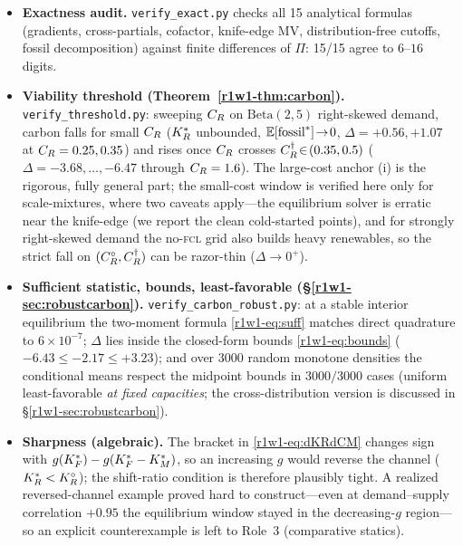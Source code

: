 \begin{itemize}[leftmargin=1.6em]
        ($-4.28,-2.76,-2.19,-5.21,-21.1,-92.1$; the last is a noisy
        finite-difference at the knife-edge $\KRs=9.2$), confirming the channel
        across the crossing. The Hessian's three eigenvalues are all strictly negative on the
        interior path and acquire a zero only as $\KRs\!\to\!\infty$ at the
        knife-edge ($\CM=0.30$, $\KRs=9.2$ and climbing)---the boundary where
        Condition~\ref{r1w1-cond:reg} lapses and the inequality is anyway immediate.
  \item \textbf{Exactness audit.} \texttt{verify\_exact.py} checks all 15
        analytical formulas (gradients, cross-partials, cofactor, knife-edge
        $\mathrm{MV}$, distribution-free cutoffs, fossil decomposition) against
        finite differences of $\Pi$: 15/15 agree to $6$--$16$ digits.
  \item \textbf{Viability threshold (Theorem~\ref{r1w1-thm:carbon}).}
        \texttt{verify\_threshold.py}: sweeping $C_R$ on $\mathrm{Beta}(2,5)$
        right-skewed demand, carbon falls for small $C_R$ ($K_R^{*}$ unbounded,
        $\mathbb{E}[\text{fossil}^{*}]\!\to\!0$, $\Delta=+0.56,+1.07$ at $C_R=0.25,0.35$)
        and rises once $C_R$ crosses $C_R^{\dagger}\!\in\!(0.35,0.5)$
        ($\Delta=-3.68,\dots,-6.47$ through $C_R=1.6$). The large-cost anchor (i)
        is the rigorous, fully general part; the small-cost window is verified
        here only for scale-mixtures, where two caveats apply---the equilibrium
        solver is erratic near the knife-edge (we report the clean
        cold-started points), and for strongly right-skewed demand the no-\textsc{fcl}
        grid also builds heavy renewables, so the strict fall on
        $(C_R^{\circ},C_R^{\dagger})$ can be razor-thin ($\Delta\!\to\!0^{+}$).
  \item \textbf{Sufficient statistic, bounds, least-favorable
        (\S\ref{r1w1-sec:robustcarbon}).} \texttt{verify\_carbon\_robust.py}: at a
        stable interior equilibrium the two-moment formula \eqref{r1w1-eq:suff} matches
        direct quadrature to $6\times10^{-7}$; $\Delta$ lies inside the
        closed-form bounds \eqref{r1w1-eq:bounds} ($-6.43\le-2.17\le+3.23$); and over
        $3000$ random monotone densities the conditional means respect the
        midpoint bounds in $3000/3000$ cases (uniform least-favorable \emph{at fixed
        capacities}; the cross-distribution version is discussed in
        \S\ref{r1w1-sec:robustcarbon}).
  \item \textbf{Sharpness (algebraic).} The bracket in \eqref{r1w1-eq:dKRdCM} changes
        sign with $g(K_F^{*})-g(K_F^{*}-K_M^{*})$, so an increasing $g$ would reverse the
        channel ($K_R^{*}<K_R^{\circ}$); the shift-ratio condition is therefore plausibly
        tight. A realized reversed-channel example proved hard to construct---even
        at demand--supply correlation $+0.95$ the equilibrium window stayed in the
        decreasing-$g$ region---so an explicit counterexample is left to Role~3
        (comparative statics).
\end{itemize}

